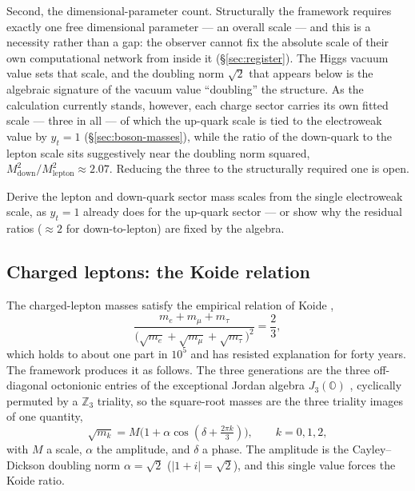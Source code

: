 Second, the dimensional-parameter count. Structurally the framework requires exactly one free
dimensional parameter --- an overall scale --- and this is a necessity rather than a gap: the
observer cannot fix the absolute scale of their own computational network from inside it
(\S\ref{sec:register}). The Higgs vacuum value sets that scale, and the doubling norm $\sqrt2$ that
appears below is the algebraic signature of the vacuum value ``doubling'' the structure. As the
calculation currently stands, however, each charge sector carries its own fitted scale --- three in
all --- of which the up-quark scale is tied to the electroweak value by $y_t = 1$
(\S\ref{sec:boson-masses}), while the ratio of the down-quark to the lepton scale sits suggestively
near the doubling norm squared, $M^2_{\mathrm{down}}/M^2_{\mathrm{lepton}} \approx 2.07$. Reducing
the three to the structurally required one is open.

\begin{openproblem}\label{op:sector-scales}
Derive the lepton and down-quark sector mass scales from the single electroweak scale, as
$y_t = 1$ already does for the up-quark sector --- or show why the residual ratios
($\approx 2$ for down-to-lepton) are fixed by the algebra.
\end{openproblem}

\subsection{Charged leptons: the Koide relation}
\label{sec:koide}

The charged-lepton masses satisfy the empirical relation of Koide \autocite{koide1983new},
\begin{equation}
  \frac{m_e + m_\mu + m_\tau}{\bigl(\sqrt{m_e}+\sqrt{m_\mu}+\sqrt{m_\tau}\bigr)^2} = \frac{2}{3},
  \label{eq:koide}
\end{equation}
which holds to about one part in $10^5$ and has resisted explanation for forty years. The framework
produces it as follows. The three generations are the three off-diagonal octonionic entries of the
exceptional Jordan algebra $J_3(\mathbb{O})$ \autocite{baez2002octonions,duboisviolettetodorov2019exceptional},
cyclically permuted by a $\mathbb{Z}_3$ triality, so the square-root masses are the three triality
images of one quantity,
\begin{equation}
  \sqrt{m_k} = M\bigl(1 + \alpha\cos(\delta + \tfrac{2\pi k}{3})\bigr), \qquad k = 0,1,2,
  \label{eq:z3}
\end{equation}
with $M$ a scale, $\alpha$ the amplitude, and $\delta$ a phase. The amplitude is the Cayley--Dickson
doubling norm $\alpha = \sqrt2$ ($|1+i| = \sqrt2$), and this single value forces the Koide ratio.


